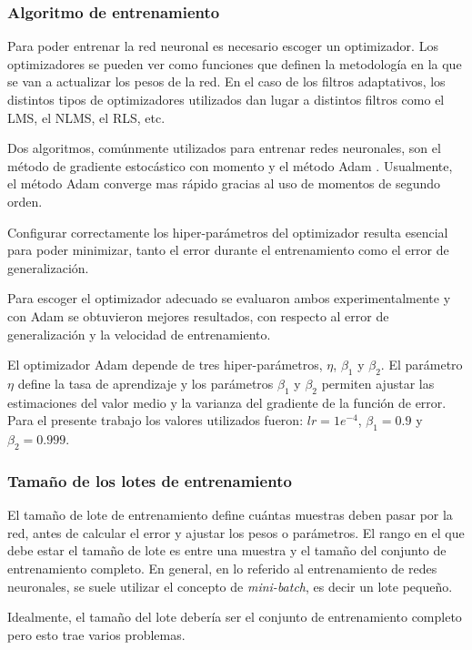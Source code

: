 \subsubsection{Algoritmo de entrenamiento}

Para poder entrenar la red neuronal es necesario escoger un optimizador. Los optimizadores se pueden ver como funciones que definen la metodología en la que se van a actualizar los pesos de la red. En el caso de los filtros adaptativos, los distintos tipos de optimizadores utilizados dan lugar a distintos filtros como el LMS, el NLMS, el RLS, etc.

Dos algoritmos, comúnmente utilizados para entrenar redes neuronales, son el método de gradiente estocástico con momento \cite{deep_learning} y el método Adam \cite{adam_optimizer}. Usualmente, el método Adam converge mas rápido gracias al uso de momentos de segundo orden.

Configurar correctamente los hiper-parámetros del optimizador resulta esencial para poder minimizar, tanto el error durante el entrenamiento como el error de generalización.

Para escoger el optimizador adecuado se evaluaron ambos experimentalmente y con Adam se obtuvieron mejores resultados, con respecto al error de generalización y la velocidad de entrenamiento. 

El optimizador Adam depende de tres hiper-parámetros, $\eta$, $\beta_1$ y $\beta_2$. El parámetro $\eta$ define la tasa de aprendizaje y los parámetros $\beta_1$ y $\beta_2$ permiten ajustar las estimaciones del valor medio y la varianza del gradiente de la función de error. Para el presente trabajo los valores utilizados fueron: $lr=1e^{-4}$, $\beta_1=0.9$ y $\beta_2=0.999$.

\subsubsection{Tamaño de los lotes de entrenamiento}

El tamaño de lote de entrenamiento define cuántas muestras deben pasar por la red, antes de calcular el error y ajustar los pesos o parámetros. El rango en el que debe estar el tamaño de lote es entre una muestra y el tamaño del conjunto de entrenamiento completo. En general, en lo referido al entrenamiento de redes neuronales, se suele utilizar el concepto de \emph{mini-batch}, es decir un lote pequeño. 

Idealmente, el tamaño del lote debería ser el conjunto de entrenamiento completo pero esto trae varios problemas.

